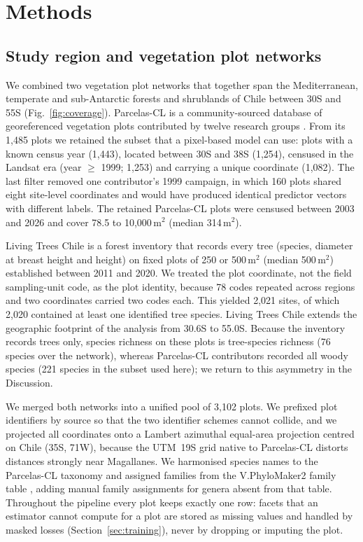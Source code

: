\documentclass[preprint,12pt]{elsarticle}
\begin{document}
\section{Methods}

\subsection{Study region and vegetation plot networks}

We combined two vegetation plot networks that together span the Mediterranean, temperate
and sub-Antarctic forests and shrublands of Chile between 30\textdegree{}S and
55\textdegree{}S (Fig.~\ref{fig:coverage}). Parcelas-CL is a community-sourced database of
georeferenced vegetation plots contributed by twelve research groups
\citep{cerdaparedes2026parcelascl,zenodo2026parcelascl}. From its 1,485 plots we retained
the subset that a pixel-based model can use: plots with a known census year (1,443),
located between 30\textdegree{}S and 38\textdegree{}S (1,254), censused in the Landsat era
(year $\geq$ 1999; 1,253) and carrying a unique coordinate (1,082). The last filter removed
one contributor's 1999 campaign, in which 160 plots shared eight site-level coordinates and
would have produced identical predictor vectors with different labels. The retained
Parcelas-CL plots were censused between 2003 and 2026 and cover 78.5 to 10,000\,m$^2$
(median 314\,m$^2$).

Living Trees Chile \citep{livingtrees_chile} is a forest inventory that records every tree
(species, diameter at breast height and height) on fixed plots of 250 or 500\,m$^2$
(median 500\,m$^2$) established between 2011 and 2020. We treated the plot coordinate, not
the field sampling-unit code, as the plot identity, because 78 codes repeated across
regions and two coordinates carried two codes each. This yielded 2,021 sites, of which
2,020 contained at least one identified tree species. Living Trees Chile extends the
geographic footprint of the analysis from 30.6\textdegree{}S to 55.0\textdegree{}S. Because
the inventory records trees only, species richness on these plots is tree-species richness
(76 species over the network), whereas Parcelas-CL contributors recorded all woody species
(221 species in the subset used here); we return to this asymmetry in the Discussion.

We merged both networks into a unified pool of 3,102 plots. We prefixed plot identifiers by
source so that the two identifier schemes cannot collide, and we projected all coordinates
onto a Lambert azimuthal equal-area projection centred on Chile (35\textdegree{}S,
71\textdegree{}W), because the UTM~19S grid native to Parcelas-CL distorts distances
strongly near Magallanes. We harmonised species names to the Parcelas-CL taxonomy and
assigned families from the V.PhyloMaker2 family table \citep{jinqian2022vphylomaker2},
adding manual family assignments for genera absent from that table. Throughout the
pipeline every plot keeps exactly one row: facets that an estimator cannot compute for a
plot are stored as missing values and handled by masked losses (Section~\ref{sec:training}),
never by dropping or imputing the plot.
\end{document}
